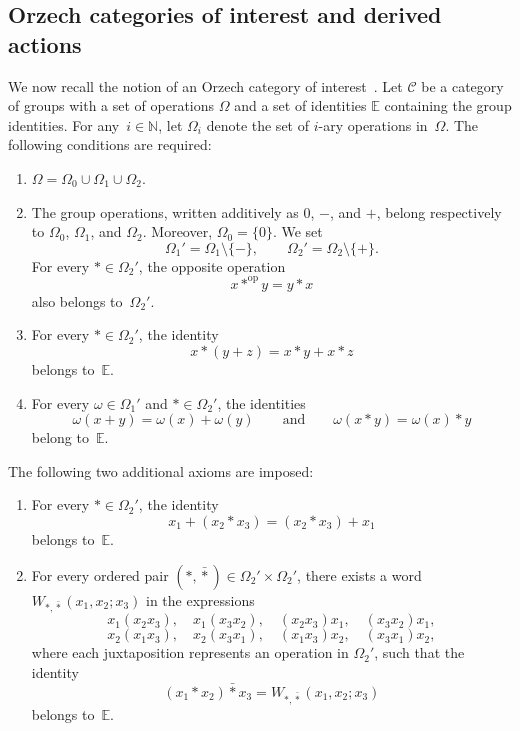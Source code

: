 \documentclass[reqno,a4paper]{amsart}
\theoremstyle{plain}
\theoremstyle{definition}
\theoremstyle{remark}
\numberwithin{equation}{section}
\newcommand{\cC}{\ensuremath{\mathcal{C}}}
\newcommand{\N}{\mathbb{N}}
\DeclareMathOperator{\op}{op}
\begin{document}
\subsection{Orzech categories of interest and derived actions}\label{SecCategoriesInterest}

We now recall the notion of an Orzech category of interest~\cite{Orzech}. Let $\cC$ be a category of groups with a set of operations $\Omega$ and a set of identities $\mathbb{E}$ containing the group identities. For any~$i\in \N$, let $\Omega_i$ denote the set of $i$-ary operations in~$\Omega$. The following conditions are required:
\begin{enumerate}
\item $\Omega=\Omega_0\cup\Omega_1\cup\Omega_2$.

\item The group operations, written additively as $0$, $-$, and $+$, belong respectively to $\Omega_0$, $\Omega_1$, and $\Omega_2$. Moreover, $\Omega_0=\{0\}$. We set
\[
\Omega_1'=\Omega_1\setminus\{-\},
\qquad
\Omega_2'=\Omega_2\setminus\{+\}.
\]
For every $*\in\Omega_2'$, the opposite operation
\[
x*^{\op}y=y*x
\]
also belongs to~$\Omega_2'$.

\item For every $*\in\Omega_2'$, the identity
\[
x*(y+z)=x*y+x*z
\]
belongs to~$\mathbb{E}$.

\item For every $\omega\in\Omega_1'$ and $*\in\Omega_2'$, the identities
\[
\omega(x+y)=\omega(x)+\omega(y)
\qquad\text{and}\qquad
\omega(x*y)=\omega(x)*y
\]
belong to~$\mathbb{E}$.
\end{enumerate}

The following two additional axioms are imposed:
\begin{enumerate}
\item[\textnormal{Axiom~1.}] For every $*\in\Omega_2'$, the identity
\[
x_1+(x_2*x_3)=(x_2*x_3)+x_1
\]
belongs to~$\mathbb{E}$.

\item[\textnormal{Axiom~2.}] For every ordered pair $(*,\bar{*})\in\Omega_2'\times\Omega_2'$, there exists a word $W_{*,\bar{*}}(x_1,x_2;x_3)$ in the expressions
\[
x_1(x_2x_3),\quad
x_1(x_3x_2),\quad
(x_2x_3)x_1,\quad
(x_3x_2)x_1,
\]
\[
x_2(x_1x_3),\quad
x_2(x_3x_1),\quad
(x_1x_3)x_2,\quad
(x_3x_1)x_2,
\]
where each juxtaposition represents an operation in $\Omega_2'$, such that the identity
\[
(x_1*x_2)\mathbin{\bar{*}}x_3=W_{*,\bar{*}}(x_1,x_2;x_3)
\]
belongs to~$\mathbb{E}$.
\end{enumerate}
\end{document}
